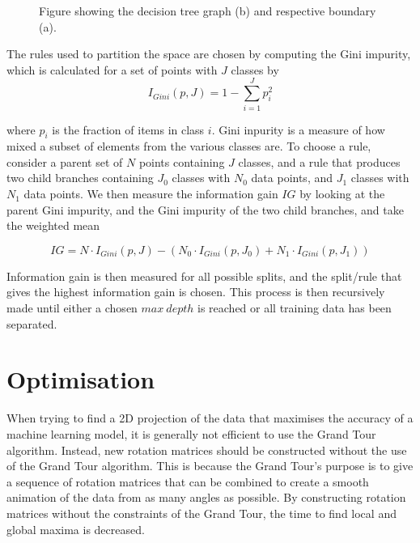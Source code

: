\documentclass[a4paper,11pt,twoside]{article}
\begin{document}
\begin{figure}[h]
    \centering
    \qquad
    \caption{Figure showing the decision tree graph (b) and respective boundary (a).}%
    \label{fig:example}%
\end{figure}
\newline

The rules used to partition the space are chosen by computing the Gini impurity, which is calculated for a set of points with $J$ classes by
\begin{equation}
I_{Gini}(p, J)=1-\sum_{i=1}^Jp_i^2
\end{equation}

where $p_i$ is the fraction of items in class $i$. Gini inpurity is a measure of how mixed a subset of elements from the various classes are. To choose a rule, consider a parent set of $N$ points containing $J$ classes, and a rule that produces two child branches containing $J_0$ classes with $N_0$ data points, and $J_1$ classes with $N_1$ data points. We then measure the information gain $IG$ by looking at the parent Gini impurity, and the Gini impurity of the two child branches, and take the weighted mean

\begin{equation}
IG= N\cdot I_{Gini}(p, J) - (N_0\cdot I_{Gini}(p, J_0) + N_1\cdot I_{Gini}(p, J_1))
\end{equation}

Information gain is then measured for all possible splits, and the split/rule that gives the highest information gain is chosen. This process is then recursively made until either a chosen $max\ depth$ is reached or all training data has been separated.  

\newpage
\section{Optimisation}

When trying to find a 2D projection of the data that maximises the accuracy of a machine learning model, it is generally not efficient to use the Grand Tour algorithm. Instead, new rotation matrices should be constructed without the use of the Grand Tour algorithm. This is because the Grand Tour's purpose is to give a sequence of rotation matrices that can be combined to create a smooth animation of the data from as many angles as possible. By constructing rotation matrices without the constraints of the Grand Tour, the time to find local and global maxima is decreased.
\end{document}
